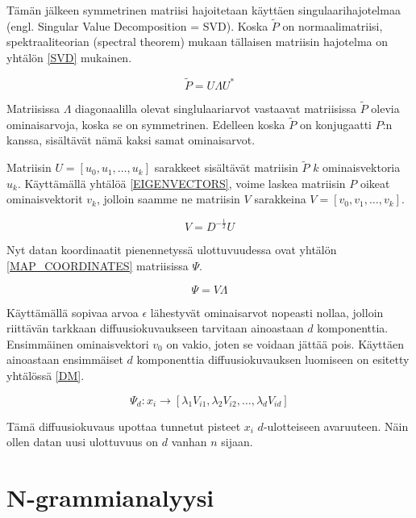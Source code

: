 Tämän jälkeen symmetrinen matriisi hajoitetaan käyttäen singulaarihajotelmaa (engl. Singular Value Decomposition = SVD). Koska $\tilde{P}$ on normaalimatriisi, spektraaliteorian (spectral theorem) mukaan tällaisen matriisin 
hajotelma on yhtälön \ref{SVD} mukainen.  

\begin{equation}
\tilde{P} = U \Lambda U^*
\label{SVD}
\end{equation}

Matriisissa $\Lambda$ diagonaalilla olevat singlulaariarvot vastaavat matriisissa $\tilde{P}$ olevia ominaisarvoja, koska se on symmetrinen. Edelleen koska $\tilde{P}$ on konjugaatti $P$:n kanssa, sisältävät nämä kaksi samat ominaisarvot. 

Matriisin $U = [ u_0, u_1, \dots, u_k ]$ sarakkeet sisältävät matriisin $\tilde{P}$ $k$ ominaisvektoria $u_k$. Käyttämällä yhtälöä \ref{EIGENVECTORS}, voime laskea matriisin $P$ oikeat ominaisvektorit $v_k$, jolloin 
saamme ne matriisin $V$ sarakkeina  $V = [v_0, v_1, \dots, v_k]$.  

\begin{equation}
V = D^{-\frac{1}{2}} U
\label{EIGENVECTORS}
\end{equation}

Nyt datan koordinaatit pienennetyssä ulottuvuudessa ovat yhtälön \ref{MAP_COORDINATES} matriisissa $\Psi$. 

\begin{equation}
\Psi = V \Lambda
\label{MAP_COORDINATES}
\end{equation}

Käyttämällä sopivaa arvoa $\epsilon$ lähestyvät ominaisarvot nopeasti nollaa, jolloin riittävän tarkkaan diffuusiokuvaukseen tarvitaan ainoastaan $d$ komponenttia. Ensimmäinen ominaisvektori $v_0$ on vakio, joten se voidaan jättää pois.
Käyttäen ainoastaan ensimmäiset $d$ komponenttia diffuusiokuvauksen luomiseen on esitetty yhtälössä \ref{DM}.

\begin{equation}
\Psi_d : x_i \to \left[ \lambda_1 V_{i1}, \lambda_2 V_{i2}, \dots, \lambda_d V_{id} \right]
\label{DM}
\end{equation}

Tämä diffuusiokuvaus upottaa tunnetut pisteet $x_i$ $d$-ulotteiseen avaruuteen. Näin ollen datan uusi ulottuvuus on $d$ vanhan $n$ sijaan.

\section{N-grammianalyysi}

